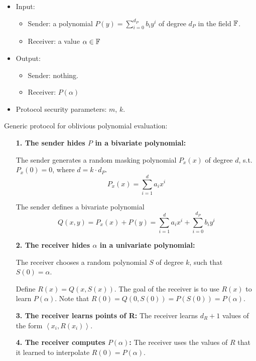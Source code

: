 \begin{itemize}
    \item Input:
    
    \begin{itemize}
        \item Sender: a polynomial $P(y) = \sum_{i=0}^{d_P} b_i y^i$ of degree $d_P$ in the field ${\mathbb F}$.
        \item Receiver: a value $\alpha \in {\mathbb F}$
    \end{itemize}
    
    \item Output:
    
    \begin{itemize}
        \item Sender: nothing.
        \item Receiver: $P(\alpha)$
    \end{itemize}
    
    \item Protocol security parameters: $m$, $k$.
    
\end{itemize}

Generic protocol for oblivious polynomial evaluation:

\begin{itemize}[align = left, leftmargin=*]

\item[\textbf{1. The sender hides $P$ in a bivariate polynomial:}]

The sender generates a random masking polynomial $P_x (x)$ of degree $d$, s.t. $P_x (0) = 0$, where $d = k \cdot d_P$.
$$P_x (x) = \sum_{i=1}^{d} a_i x^i$$

The sender defines a bivariate polynomial
$$ Q(x,y) = P_x(x) + P(y) = \sum_{i=1}^{d} a_i x^i + \sum_{i=0}^{d_P} b_i y^i $$

\item[\textbf{2. The receiver hides $\alpha$ in a univariate polynomial:}]

The receiver chooses a random polynomial $S$ of degree $k$, such that $S(0) = \alpha$.

Define $R(x) = Q( x, S(x))$. The goal of the receiver is to use $R(x)$ to learn $P(\alpha)$. Note that $R(0) = Q(0,S(0)) = P(S(0)) = P(\alpha)$.

\item[\textbf{3. The receiver learns points of R:}] The receiver learns $d_R + 1$ values of the form $\left\langle x_i , R(x_i) \right\rangle$.

\item[\textbf{4. The receiver computes $P(\alpha)$:}] The receiver uses the values of $R$ that it learned to interpolate $R(0)=P(\alpha)$.

\end{itemize}

